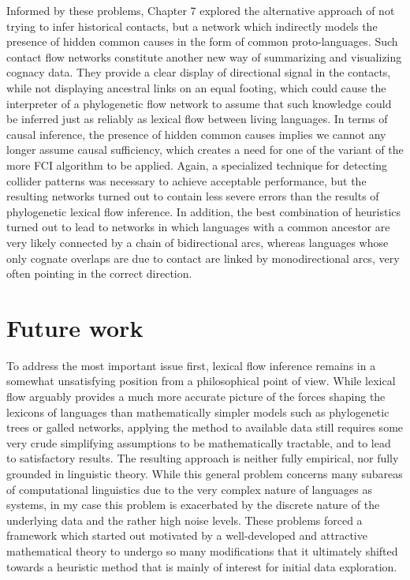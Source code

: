 Informed by these problems, Chapter 7 explored the alternative approach of not trying to infer historical contacts, but a network which indirectly models the presence of hidden common causes in the form of common proto-languages. Such contact flow networks constitute another new way of summarizing and visualizing cognacy data. They provide a clear display of directional signal in the contacts, while not displaying ancestral links on an equal footing, which could cause the interpreter of a phylogenetic flow network to assume that such knowledge could be inferred just as reliably as lexical flow between living languages. In terms of causal inference, the presence of hidden common causes implies we cannot any longer assume causal sufficiency, which creates a need for one of the variant of the more FCI algorithm to be applied. Again, a specialized technique for detecting collider patterns was necessary to achieve acceptable performance, but the resulting networks turned out to contain less severe errors than the results of phylogenetic lexical flow inference. In addition, the best combination of heuristics turned out to lead to networks in which languages with a common ancestor are very likely connected by a chain of bidirectional arcs, whereas languages whose only cognate overlaps are due to contact are linked by monodirectional arcs, very often pointing in the correct direction. 

\section{Future work}
To address the most important issue first, lexical flow inference remains in a somewhat unsatisfying position from a philosophical point of view. While lexical flow arguably provides a much more accurate picture of the forces shaping the lexicons of languages than mathematically simpler models such as phylogenetic trees or galled networks, applying the method to available data still requires some very crude simplifying assumptions to be mathematically tractable, and to lead to satisfactory results. The resulting approach is neither fully empirical, nor fully grounded in linguistic theory. While this general problem concerns many subareas of computational linguistics due to the very complex nature of languages as systems, in my case this problem is exacerbated by the discrete nature of the underlying data and the rather high noise levels. These problems forced a framework which started out motivated by a well-developed and attractive mathematical theory to undergo so many modifications that it ultimately shifted towards a heuristic method that is mainly of interest for initial data exploration.

